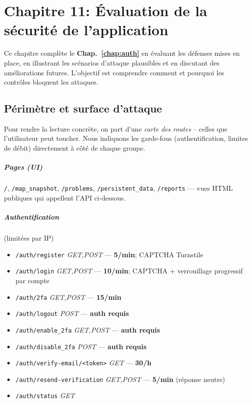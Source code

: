 \chapter{Chapitre 11: Évaluation de la sécurité de l'application}\label{chap:security}

\noindent Ce chapitre complète le \textbf{Chap.~\ref{chap:auth}} en évaluant les défenses mises en place, en illustrant les scénarios d'attaque plausibles et en discutant des améliorations futures. L'objectif est comprendre comment et pourquoi les contrôles bloquent les attaques.

\section{Périmètre et surface d'attaque}
\noindent Pour rendre la lecture concrète, on part d'une \emph{carte des routes} – celles que l'utilisateur peut toucher. Nous indiquons les garde-fous (authentification, limites de débit) directement à côté de chaque groupe.

\paragraph{Pages (UI)} \texttt{/}, \texttt{/map\_snapshot}, \texttt{/problems}, \texttt{/persistent\_data}, \texttt{/reports} — vues HTML publiques qui appellent l'API ci-dessous.

\paragraph{Authentification} (limitées par IP)
\begin{itemize}
  \item \texttt{/auth/register} \textit{GET,POST} — \textbf{5/min}; CAPTCHA Turnstile
  \item \texttt{/auth/login} \textit{GET,POST} — \textbf{10/min}; CAPTCHA + verrouillage progressif par compte
  \item \texttt{/auth/2fa} \textit{GET,POST} — \textbf{15/min}
  \item \texttt{/auth/logout} \textit{POST} — \textbf{auth requis}
  \item \texttt{/auth/enable\_2fa} \textit{GET,POST} — \textbf{auth requis}
  \item \texttt{/auth/disable\_2fa} \textit{POST} — \textbf{auth requis}
  \item \texttt{/auth/verify-email/<token>} \textit{GET} — \textbf{30/h}
  \item \texttt{/auth/resend-verification} \textit{GET,POST} — \textbf{5/min} (réponse neutre)
  \item \texttt{/auth/status} \textit{GET}
\end{itemize}


